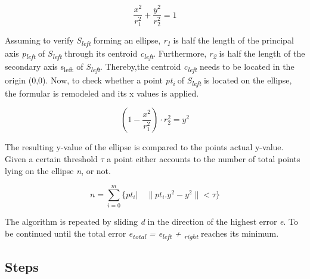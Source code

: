 \begin{equation*}
\dfrac{x^2}{r_1^2} + \dfrac{y^2}{r_2^2} = 1
\end{equation*}

Assuming to verify \textit{S\textsubscript{left}} forming an ellipse, \textit{r\textsubscript{1}} is half the length of the principal axis \textit{p\textsubscript{left}} of \textit{S\textsubscript{left}} through its centroid \textit{c\textsubscript{left}}. Furthermore, \textit{r\textsubscript{2}} is half the length of the secondary axis {s\textsubscript{left}} of \textit{S\textsubscript{left}}. Thereby,the centroid \textit{c\textsubscript{left}} needs to be located in the origin (0,0). 
Now, to check whether a point \textit{pt\textsubscript{i}} of \textit{S\textsubscript{left}} is located on the ellipse, the formular is remodeled and its x values is applied. 

\begin{equation*}
	(1 -  \dfrac{x^2}{r_1^2}) \cdot {r_2^2} = y^2
\end{equation*}

The resulting y-value of the ellipse is compared to the points actual y-value. Given a certain threshold $\tau$ a point either accounts to the number of total points lying on the ellipse \textit{n}, or not.

\begin{equation*}
	 n = \sum_{i=0}^{m}\{pt_i \vert \quad \|pt_i.y^2 - y^2 \| < \tau\}
\end{equation*}

The algorithm is repeated by sliding \textit{d} in the direction of the highest error \textit{e}. To be continued until the total error \textit{e\textsubscript{total} = e\textsubscript{left} + \textsubscript{right}} reaches its minimum.

\subsection{Steps}

